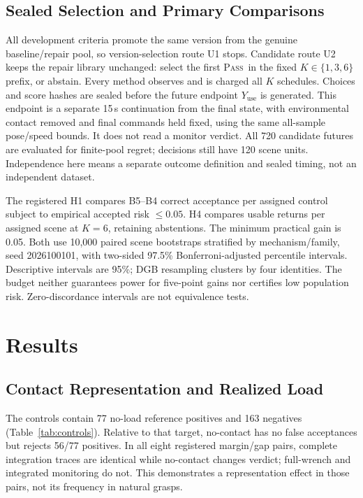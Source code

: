 \documentclass[conference,10pt,letterpaper]{IEEEtran}
\newcommand{\Pass}{\textsc{Pass}}
\begin{document}
\subsection{Sealed Selection and Primary Comparisons}
All development criteria promote the same version from the genuine
baseline/repair pool, so version-selection route U1 stops. Candidate route U2
keeps the repair library unchanged: select the first \Pass\ in the fixed
$K\in\{1,3,6\}$ prefix, or abstain. Every method observes and is charged all
$K$ schedules. Choices and score hashes are sealed before the future endpoint
$Y_{\mathrm{use}}$ is generated. This endpoint is a separate 15\,s continuation
from the final state, with environmental contact removed and final commands
held fixed, using the same all-sample pose/speed bounds. It does not read a
monitor verdict. All 720 candidate futures are evaluated for finite-pool
regret; decisions still have 120 scene units. Independence here means a
separate outcome definition and sealed timing, not an independent dataset.

The registered H1 compares B5--B4 correct acceptance per assigned control
subject to empirical accepted risk $\le0.05$. H4 compares usable returns per
assigned scene at $K=6$, retaining abstentions. The minimum practical gain is
0.05. Both use 10,000 paired scene bootstraps stratified by mechanism/family,
seed 2026100101, with two-sided 97.5\% Bonferroni-adjusted percentile intervals.
Descriptive intervals are 95\%; DGB resampling clusters by four identities.
The budget neither guarantees power for five-point gains nor certifies low
population risk. Zero-discordance intervals are not equivalence tests.

\section{Results}
\subsection{Contact Representation and Realized Load}
The controls contain 77 no-load reference positives and 163 negatives
(Table~\ref{tab:controls}). Relative to that target, no-contact has no false
acceptances but rejects 56/77 positives. In all eight registered margin/gap
pairs, complete integration traces are identical while no-contact changes
verdict; full-wrench and integrated monitoring do not. This demonstrates a
representation effect in those pairs, not its frequency in natural grasps.
\end{document}
